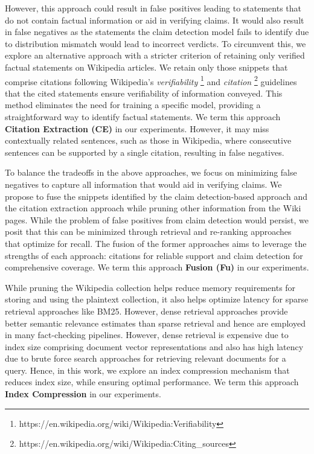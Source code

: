 However, this approach could result in false positives leading to statements that do not contain factual information or aid in verifying claims. It would also result in false negatives as the statements the claim detection model fails to identify due to distribution mismatch would lead to incorrect verdicts. To circumvent this, we explore an alternative approach with a stricter criterion of retaining only verified factual statements on Wikipedia articles. We retain only those snippets that comprise citations following Wikipedia's \textit{verifiability} \footnote{https://en.wikipedia.org/wiki/Wikipedia:Verifiability} and \textit{citation} \footnote{https://en.wikipedia.org/wiki/Wikipedia:Citing\_sources} guidelines that the cited statements ensure verifiability of information conveyed. This method eliminates the need for training a specific model, providing a straightforward way to identify factual statements. We term this approach \textbf{Citation Extraction (CE)} in our experiments. However, it may miss contextually related sentences, such as those in Wikipedia, where consecutive sentences can be supported by a single citation, resulting in false negatives. 

To balance the tradeoffs in the above approaches, we focus on minimizing false negatives to capture all information that would aid in verifying claims. We propose to fuse the snippets identified by the claim detection-based approach and the citation extraction approach while pruning other information from the Wiki pages. While the problem of false positives from claim detection would persist, we posit that this can be minimized through retrieval and re-ranking approaches that optimize for recall.
The fusion of the former approaches aims to leverage the strengths of each approach: citations for reliable support and claim detection for comprehensive coverage. We term this approach \textbf{Fusion (Fu)} in our experiments.

While pruning the Wikipedia collection helps reduce memory requirements for storing and using the plaintext collection, it also helps optimize latency for sparse retrieval approaches like BM25. However, dense retrieval approaches provide better semantic relevance estimates than sparse retrieval and hence are employed in many fact-checking pipelines. However, dense retrieval is expensive due to index size comprising document vector representations and also has high latency due to brute force search approaches for retrieving relevant documents for a query. Hence, in this work, we explore an index compression mechanism that reduces index size, while ensuring optimal performance. We term this approach \textbf{Index Compression} in our experiments.


